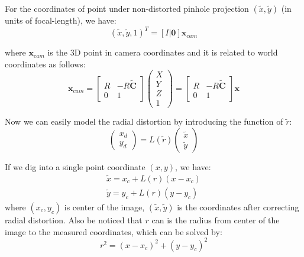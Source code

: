 \documentclass[conference]{IEEEtran}
\newcommand{\mat}[1]{\mathbf{#1}} %
\begin{document}
For the coordinates of point under non-distorted pinhole projection $(\tilde{x}, \tilde{y})$ (in units of focal-length), we have:
\begin{equation}
	(\tilde{x}, \tilde{y}, 1)^T = [ I| \mat{0}] \mat{x}_{cam}
\end{equation}

where $\mat{x}_{cam}$ is the 3D point in camera coordinates and it is related to world coordinates as follows:
\begin{equation}
	\mat{x}_{cam} = \begin{bmatrix}
				R & -R\tilde{\mat{C}}\\
				0 & 1
			\end{bmatrix}
			\begin{pmatrix}
				X\\
				Y\\
				Z\\
				1
			\end{pmatrix}
			=\begin{bmatrix}
				R & -R\tilde{\mat{C}}\\
				0 & 1
			\end{bmatrix}\mat{x}
\end{equation}

Now we can easily model the radial distortion by introducing the function of $\tilde{r}$:
\begin{equation}
	\begin{pmatrix}
		x_d\\
		y_d
	\end{pmatrix}
	=L(\tilde{r})\begin{pmatrix}
		\tilde{x}\\
		\tilde{y}
	\end{pmatrix}
\end{equation}

If we dig into a single point coordinate $(x, y)$, we have:
\begin{equation}
\begin{split}
	\tilde{x} = x_c + L(r)(x-x_c)\\
	\tilde{y} = y_c + L(r)(y-y_c)
\end{split}
\end{equation}
where $(x_c, y_c)$ is center of the image, $(\tilde{x}, \tilde{y})$ is the coordinates after correcting radial distortion. Also be noticed that $r$ can is the radius from center of the image to the measured coordinates, which can be solved by:
\begin{equation}
	r^2 = (x-x_c)^2 + (y-y_c)^2
\end{equation}
\end{document}
